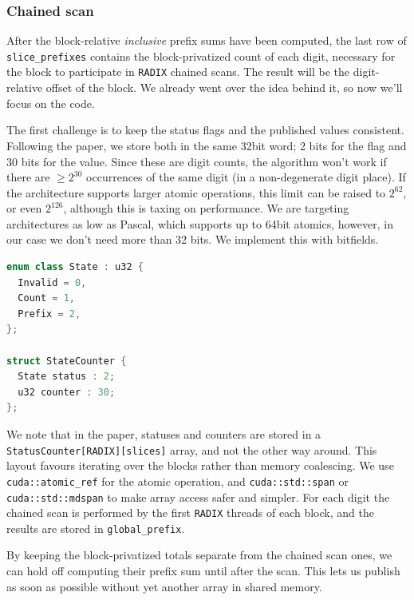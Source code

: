 \documentclass[a4paper]{report}
\begin{document}
\subsubsection{Chained scan}

After the block-relative \emph{inclusive} prefix sums have been computed, the last row of \lstinline{slice_prefixes} contains the block-privatized count of each digit, necessary for the block to participate in \lstinline{RADIX} chained scans. The result will be the digit-relative offset of the block. We already went over the idea behind it, so now we'll focus on the code.

The first challenge is to keep the status flags and the published values consistent. Following the paper, we store both in the same 32bit word; 2 bits for the flag and 30 bits for the value. Since these are digit counts, the algorithm won't work if there are $\geq2^{30}$ occurrences of the same digit (in a non-degenerate digit place). If the architecture supports larger atomic operations, this limit can be raised to $2^{62}$, or even $2^{126}$, although this is taxing on performance. We are targeting architectures as low as Pascal, which supports up to 64bit atomics, however, in our case we don't need more than 32 bits. We implement this with bitfields.

\newpage

\begin{lstlisting}[caption={Status + counter bitfield}, language=c++]
enum class State : u32 {
  Invalid = 0,
  Count = 1,
  Prefix = 2,
};

struct StateCounter {
  State status : 2;
  u32 counter : 30;
};
\end{lstlisting}

We note that in the paper, statuses and counters are stored in a \lstinline{StatusCounter[RADIX][slices]} array, and not the other way around. This layout favours iterating over the blocks rather than memory coalescing. We use \lstinline{cuda::atomic_ref} for the atomic operation, and \lstinline{cuda::std::span} or \lstinline{cuda::std::mdspan} to make array access safer and simpler. For each digit the chained scan is performed by the first \lstinline{RADIX} threads of each block, and the results are stored in \lstinline{global_prefix}.

By keeping the block-privatized totals separate from the chained scan ones, we can hold off computing their prefix sum until after the scan. This lets us publish as soon as possible without yet another array in shared memory.
\end{document}
